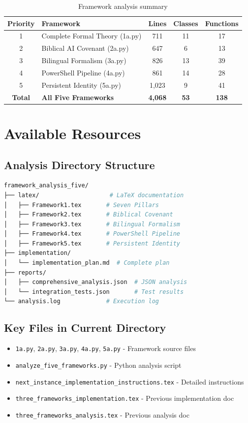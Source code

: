 \documentclass[12pt]{article}
\begin{document}
\begin{table}[h]
\centering
\begin{tabular}{|c|l|c|c|c|}
\hline
\textbf{Priority} & \textbf{Framework} & \textbf{Lines} & \textbf{Classes} & \textbf{Functions} \\
\hline
1 & Complete Formal Theory (1a.py) & 711 & 11 & 17 \\
2 & Biblical AI Covenant (2a.py) & 647 & 6 & 13 \\
3 & Bilingual Formalism (3a.py) & 826 & 13 & 39 \\
4 & PowerShell Pipeline (4a.py) & 861 & 14 & 28 \\
5 & Persistent Identity (5a.py) & 1,023 & 9 & 41 \\
\hline
\textbf{Total} & \textbf{All Five Frameworks} & \textbf{4,068} & \textbf{53} & \textbf{138} \\
\hline
\end{tabular}
\caption{Framework analysis summary}
\end{table}

\section{Available Resources}

\subsection{Analysis Directory Structure}
\begin{lstlisting}[language=bash]
framework_analysis_five/
├── latex/                    # LaTeX documentation
│   ├── Framework1.tex       # Seven Pillars
│   ├── Framework2.tex       # Biblical Covenant
│   ├── Framework3.tex       # Bilingual Formalism
│   ├── Framework4.tex       # PowerShell Pipeline
│   ├── Framework5.tex       # Persistent Identity
├── implementation/
│   └── implementation_plan.md  # Complete plan
├── reports/
│   ├── comprehensive_analysis.json  # JSON analysis
│   └── integration_tests.json       # Test results
└── analysis.log             # Execution log
\end{lstlisting}

\subsection{Key Files in Current Directory}
\begin{itemize}
    \item \texttt{1a.py}, \texttt{2a.py}, \texttt{3a.py}, \texttt{4a.py}, \texttt{5a.py} - Framework source files
    \item \texttt{analyze\_five\_frameworks.py} - Python analysis script
    \item \texttt{next\_instance\_implementation\_instructions.tex} - Detailed instructions
    \item \texttt{three\_frameworks\_implementation.tex} - Previous implementation doc
    \item \texttt{three\_frameworks\_analysis.tex} - Previous analysis doc
\end{itemize}
\end{document}
